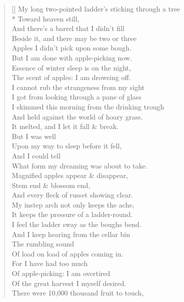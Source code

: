 \documentclass[MAIN]{subfiles}
\begin{document}
\settowidth{\versewidth}{My long two-pointed ladder's sticking through a tree}
\begin{verse}[\versewidth]
My long two-pointed ladder's sticking through a tree\\*
Toward heaven still,\\
And there's a barrel that I didn't fill\\
Beside it, and there may be two or three\\
Apples I didn't pick upon some bough.\\
But I am done with apple-picking now.\\
Essence of winter sleep is on the night,\\
The scent of apples: I am drowsing off.\\
I cannot rub the strangeness from my sight\\
I got from looking through a pane of glass\\
I skimmed this morning from the drinking trough\\
And held against the world of hoary grass.\\
It melted, and I let it fall \& break.\\
But I was well\\
Upon my way to sleep before it fell,\\
And I could tell\\
What form my dreaming was about to take.\\
Magnified apples appear \& disappear,\\
Stem end \& blossom end,\\
And every fleck of russet showing clear.\\ 
My instep arch not only keeps the ache,\\
It keeps the pressure of a ladder-round.\\
I feel the ladder sway as the boughs bend.\\
And I keep hearing from the cellar bin\\
The rumbling sound\\
Of load on load of apples coming in.\\
For I have had too much\\
Of apple-picking: I am overtired\\
Of the great harvest I myself desired.\\
There were 10,000 thousand fruit to touch,\\ 

\end{verse}
\end{document}
